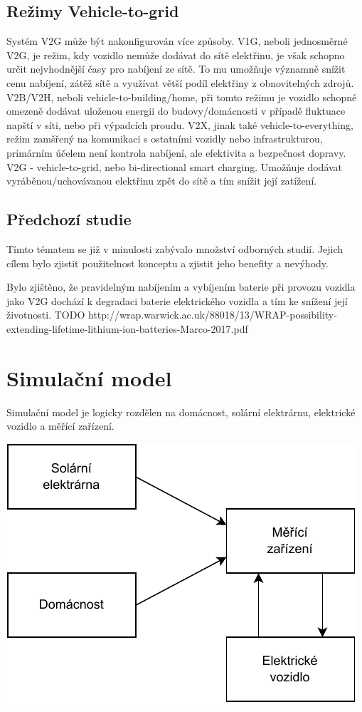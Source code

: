 \documentclass[12pt,a4paper]{article}
\begin{document}
\subsection{Režimy Vehicle-to-grid}
Systém V2G může být nakonfigurován více způsoby.
V1G, neboli jednosměrné V2G, je režim, kdy vozidlo nemůže dodávat do sítě elektřinu,
je však schopno určit nejvhodnější časy pro nabíjení ze sítě. To mu umožňuje významně snížit cenu nabíjení, zátěž sítě a využívat větší podíl elektřiny z obnovitelných zdrojů.
V2B/V2H, neboli vehicle-to-building/home, při tomto režimu je vozidlo schopné omezeně dodávat uloženou energii do budovy/domácnosti v případě fluktuace napští v síti, nebo při výpadcích proudu.
V2X, jinak také vehicle-to-everything, režim zamšřený na komunikaci s ostatními vozidly nebo infrastrukturou, primárním účelem není kontrola nabíjení, ale efektivita a bezpečnost dopravy.
V2G - vehicle-to-grid, nebo bi-directional smart charging. Umožňuje dodávat vyráběnou/uchovávanou elektřinu zpět do sítě a tím snížit její zatížení.

\subsection{Předchozí studie}
Tímto tématem se již v minulosti zabývalo množství odborných studií. Jejich cílem bylo zjistit použitelnost konceptu a zjistit jeho benefity a nevýhody. 


Bylo zjištěno, že pravidelným nabíjením a vybíjením baterie při provozu vozidla jako V2G dochází k degradaci baterie elektrického vozidla a tím ke snížení její životnosti.
TODO http://wrap.warwick.ac.uk/88018/13/WRAP-possibility-extending-lifetime-lithium-ion-batteries-Marco-2017.pdf

\section{Simulační model}
Simulační model je logicky rozdělen na domácnost, solární elektrárnu, elektrické vozidlo a měřící zařízení.

\bigskip
\includegraphics[width=0.5\linewidth]{img/diagram.pdf}
\bigskip
\end{document}

